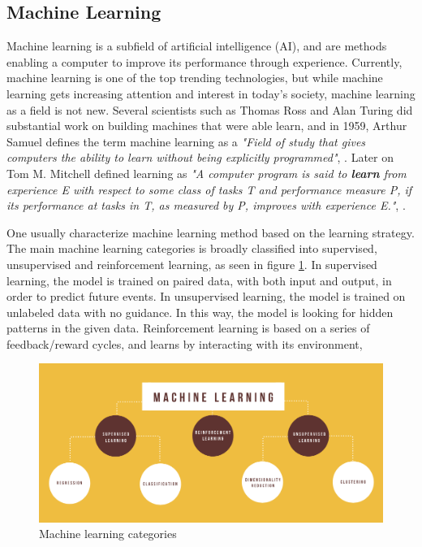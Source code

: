 \subsection{Machine Learning}
\label{sec:ML}

Machine learning is a subfield of artificial intelligence (AI), and are methods enabling a computer to improve its performance through experience. Currently, machine learning is one of the top trending technologies, but while machine learning gets increasing attention and interest in today's society, machine learning as a field is not new. Several scientists such as Thomas Ross and Alan Turing did substantial work on building machines that were able learn, and in 1959, Arthur Samuel defines the term machine learning as a \emph{"Field of study that gives computers the ability to learn without being explicitly programmed"}, \citep{ML_def}. Later on Tom M. Mitchell defined learning as \emph{"A computer program is said to \textbf{learn} from experience E with respect to some class of tasks T and performance measure P, if its performance at tasks in T, as measured by P, improves with experience E."}, \citep{Mitchell}.

One usually characterize machine learning method based on the learning strategy. The main machine learning categories is broadly classified into supervised, unsupervised and reinforcement learning, as seen in figure \ref{fig:ML_kategorier}. In supervised learning, the model is trained on paired data, with both input and output, in order to predict future events. In unsupervised learning, the model is trained on unlabeled data with no guidance. In this way, the model is looking for hidden patterns in the given data. Reinforcement learning is based on a series of feedback/reward cycles, and learns by interacting with its environment, \citep{Definitions}

\begin{figure}[h!]
\centering
\includegraphics[scale=0.45]{Images/1_introduction/ML_kategorier.png}
\caption{Machine learning categories}
\label{fig:ML_kategorier}
\end{figure}

